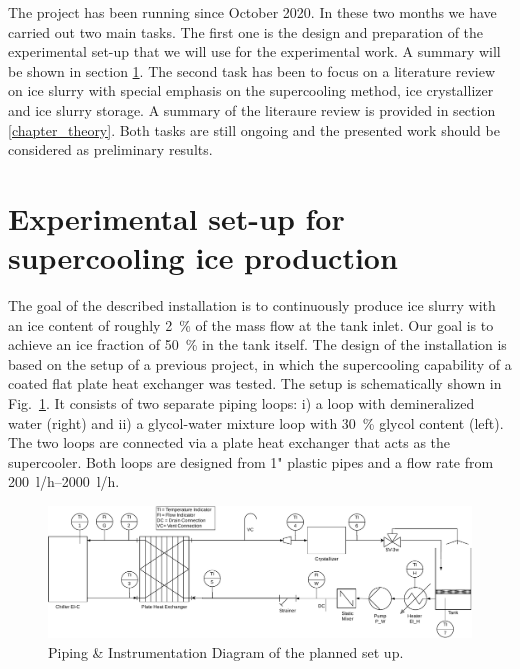 \documentclass[english]{SFOEYearlyReportEnglish_2018}
\begin{document}
The project has been running since October 2020. In these two months we have carried out two main tasks. The first one is the design and preparation of the experimental set-up that we will use for the experimental work. A summary will be shown in section \ref{chapter_exp_setup}. The second task has been to focus on a literature review on ice slurry with special emphasis on the supercooling method, ice crystallizer and ice slurry storage. A summary of the literaure review is provided in section \ref{chapter_theory}. Both tasks are still ongoing and the presented work should be considered as preliminary results.
 

\section{Experimental set-up for supercooling ice production}
\label{chapter_exp_setup}


\noindent
 The goal of the described installation is to continuously produce ice slurry with an ice content of roughly \SI{2}{\%} of the mass flow at the tank inlet. Our goal is to achieve an ice fraction of \SI{50}{\%} in the tank itself. The design of the installation is based on the setup of a previous project, in which the supercooling capability of a coated flat plate heat exchanger was tested. The setup is schematically shown in Fig.~\ref{fig:exp_setup}. It consists of two separate piping loops: i) a loop with demineralized water (right) and ii) a glycol-water mixture loop with \SI{30}{\%} glycol content (left). The two loops are connected via a plate heat exchanger that acts as the supercooler. Both loops are designed from 1" plastic pipes and a flow rate from \SIrange{200}{2000}{l/h}.

\begin{figure}[!htbp]
    \centering
    \includegraphics[trim={0 0 0 0},clip,width=\textwidth]{figures/SetUp_v01.pdf}
    \caption{Piping \& Instrumentation Diagram of the planned set up.}
   \label{fig:exp_setup}
\end{figure}
\end{document}
